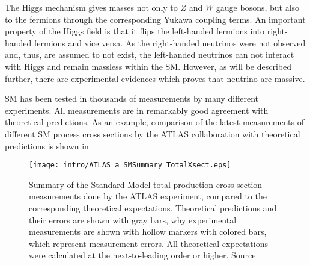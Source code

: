 The Higgs mechanism gives masses not only to $Z$ and $W$ gauge bosons, but also to the fermions through the corresponding Yukawa coupling terms. An important property of the Higgs field is that it flips the left-handed fermions into right-handed fermions and vice versa. 
As the right-handed neutrinos were not observed and, thus, are assumed to not exist, the left-handed
neutrinos can not interact with Higgs and remain massless within the SM. 
However, as will be described further, there are experimental evidences which proves that neutrino are massive.

SM has been tested in thousands of measurements by many different experiments.
All measurements are in remarkably good agreement with theoretical predictions.
As an example, comparison of the latest measurements of different SM process cross sections by the ATLAS collaboration with theoretical predictions is shown in
.

\begin{figure}[]
  \centering
  \texttt{[image: intro/ATLAS\_a\_SMSummary\_TotalXsect.eps]}
  \caption{
  Summary of the Standard Model total production cross section measurements done by the ATLAS experiment, compared to the corresponding theoretical expectations. 
  Theoretical predictions and their errors are shown with gray bars, why experimental
  measurements are shown with hollow markers with colored bars, which represent measurement errors.
  All theoretical expectations were calculated at the next-to-leading order or higher. 
  Source~\cite{sm_atlas_public_plots_2016}.
  }
  \label{fig:SM_theory_vs_data}
\end{figure}








